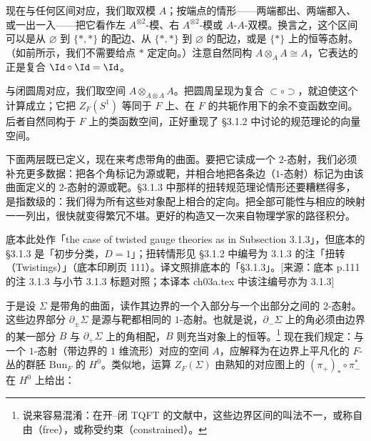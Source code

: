 现在与任何区间对应，我们取双模 $A$；按端点的情形——两端都出、两端都入、或一出一入——把它看作左 $A^{\otimes 2}$-模、右 $A^{\otimes 2}$-模或 $A$-$A$-双模。换言之，这个区间可以是从 $\varnothing$ 到 $\{*,*\}$ 的配边、从 $\{*,*\}$ 到 $\varnothing$ 的配边，或是 $\{*\}$ 上的恒等态射。（如前所示，我们不需要给点 $*$ 定定向。）注意自然同构 $A\otimes_A A\cong A$，它表达的正是复合 $\Id\circ\Id=\Id$。

与闭圆周对应，我们取空间 $A\otimes_{A\otimes A}A$。把圆周呈现为复合 $\subset\circ\supset$，就迫使这个计算成立；它把 $Z_F(S^1)$ 等同于 $F$ 上、在 $F$ 的共轭作用下的余不变函数空间。后者自然同构于 $F$ 上的类函数空间，正好重现了 §3.1.2 中讨论的规范理论的向量空间。

下面两层既已定义，现在来考虑带角的曲面。要把它读成一个 $2$-态射，我们必须补充更多数据：把各个角标记为源或靶，并相合地把各条边（$1$-态射）标记为由该曲面定义的 $2$-态射的源或靶。§3.1.3 中那样的扭转规范理论情形还要糟糕得多，是指数级的：我们得为所有这些对象配上相合的定向。把全部可能性与相应的映射一一列出，很快就变得繁冗不堪。更好的构造又一次来自物理学家的路径积分。

\begin{annote}
底本此处作「the case of twisted gauge theories as in Subsection 3.1.3」，但底本的 §3.1.3 是「初步分类，$D=1$」；扭转情形见 §3.1.2 中编号为 3.1.3 的注「扭转（Twistings）」（底本印刷页 111）。译文照排底本的「§3.1.3」。[来源：底本 p.111 的注 3.1.3 与小节 3.1.3 标题对照；本译本 ch03a.tex 中该注编号亦为 3.1.3]
\end{annote}

于是设 $\Sigma$ 是带角的曲面，读作其边界的一个入部分与一个出部分之间的 $2$-态射。这些边界部分 $\partial_\pm\Sigma$ 是源与靶都相同的 $1$-态射。也就是说，$\partial_-\Sigma$ 上的角必须由边界的某一部分 $B$ 与 $\partial_+\Sigma$ 上的角相配，$B$ 则充当对象上的恒等。\footnote{说来容易混淆：在开–闭 TQFT 的文献中，这些边界区间的叫法不一，或称自由（free），或称受约束（constrained）。} 现在我们规定：与一个 $1$-态射（带边界的 $1$ 维流形）对应的空间 $A$，应解释为在边界上平凡化的 $F$-丛的群胚 $\mathrm{Bun}_F$ 的 $H^0$。类似地，运算 $Z_F(\Sigma)$ 由熟知的对应图上的 $(\pi_+)_*\circ\pi_-^*$ 在 $H^0$ 上给出：

\begin{center}
\end{center}

